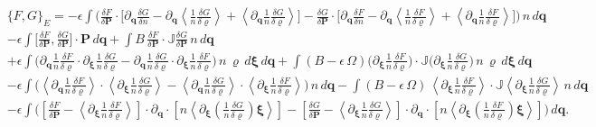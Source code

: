\documentclass[%
 aip,
 amsmath,amssymb,
reprint, onecolumn %
]{revtex4-1}
\begin{document}
\begin{align}
&\{F,G\}_{E} =-\epsilon\int\bigg(\frac{\delta F}{\delta\bm{P}}\cdot \bigg[\partial_{\bm{q}}\frac{\delta G}{\delta n} - \partial_{\bm{q}}\left\langle\frac{1}{n}\frac{\delta G}{\delta\varrho}\right\rangle + \left\langle\partial_{\bm{q}}\frac{1}{n}\frac{\delta G}{\delta\varrho}\right\rangle\bigg]-\frac{\delta G}{\delta\bm{P}}\cdot \bigg[\partial_{\bm{q}}\frac{\delta F}{\delta n} - \partial_{\bm{q}}\left\langle\frac{1}{n}\frac{\delta F}{\delta\varrho}\right\rangle + \left\langle\partial_{\bm{q}}\frac{1}{n}\frac{\delta F}{\delta\varrho}\right\rangle\bigg]\bigg)\,n\,d\bm{q}\nonumber\\
%
&-\epsilon\int\bigg[\frac{\delta F}{\delta\bm{P}},\frac{\delta G}{\delta\bm{P}}\bigg]\cdot\bm{P}\,d\bm{q} +\int B\,\frac{\delta F}{\delta\bm{P}}\cdot \mathbb{J}\frac{\delta G}{\delta\bm{P}} \,n\,d\bm{q}\nonumber\\
&+\epsilon\int \bigg(\partial_{\bm{q}}\frac{1}{n}\frac{\delta F}{\delta \varrho}\cdot \partial_{\bm{\xi}}\frac{1}{n}\frac{\delta G}{\delta\varrho} -\partial_{\bm{q}}\frac{1}{n}\frac{\delta G}{\delta \varrho}\cdot \partial_{\bm{\xi}}\frac{1}{n}\frac{\delta F}{\delta\varrho} \bigg)\,n\,\varrho\,d\bm{\xi}\,d\bm{q} + \int (B-\epsilon\,\Omega)\bigg(\partial_{\bm{\xi}}\frac{1}{n}\frac{\delta F}{\delta\varrho}\bigg)\cdot\mathbb{J}\bigg(\partial_{\bm{\xi}}\frac{1}{n}\frac{\delta G}{\delta\varrho}\bigg)\,n\,\varrho\,d\bm{\xi}\,d\bm{q}\nonumber\\
&-\epsilon\int \bigg(\left\langle\partial_{\bm{q}}\frac{1}{n}\frac{\delta F}{\delta\varrho}\right\rangle\cdot\left\langle\partial_{\bm{\xi}}\frac{1}{n}\frac{\delta G}{\delta\varrho}\right\rangle-\left\langle\partial_{\bm{q}}\frac{1}{n}\frac{\delta G}{\delta\varrho}\right\rangle\cdot\left\langle\partial_{\bm{\xi}}\frac{1}{n}\frac{\delta F}{\delta\varrho}\right\rangle\bigg)\,n\,d\bm{q}-\int (B-\epsilon\,\Omega)\, \left\langle\partial_{\bm{\xi}}\frac{1}{n}\frac{\delta F}{\delta\varrho}\right\rangle\cdot \mathbb{J} \left\langle\partial_{\bm{\xi}}\frac{1}{n}\frac{\delta G}{\delta\varrho}\right\rangle\,n\,d\bm{q}\nonumber\\
&- \epsilon \int \bigg(\left[\frac{\delta F}{\delta\bm{P}} - \left\langle\partial_{\bm{\xi}}\frac{1}{n}\frac{\delta F}{\delta\varrho}\right\rangle\right]\cdot\partial_{\bm{q}}\cdot\left[n\left\langle\partial_{\bm{\xi}}\left(\frac{1}{n}\frac{\delta G}{\delta\varrho}\right)\bm{\xi}\right\rangle\right] -\left[\frac{\delta G}{\delta\bm{P}} - \left\langle\partial_{\bm{\xi}}\frac{1}{n}\frac{\delta G}{\delta\varrho}\right\rangle\right]\cdot\partial_{\bm{q}}\cdot\left[n\left\langle\partial_{\bm{\xi}}\left(\frac{1}{n}\frac{\delta F}{\delta\varrho}\right)\bm{\xi}\right\rangle\right] \bigg)\,d\bm{q}.\label{VP_cbracket}
\end{align}
\end{document}

